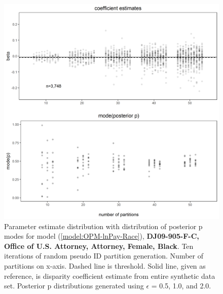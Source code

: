 \documentclass[10pt, letterpaper]{article}
\begin{document}
\begin{spacing}{1.0}
\begin{figure}[h!]
    \centering
    \includegraphics[width=5in]{images/RacePayDifferentialBetaWithPosteriorDistribution-DJ09-905-F-C.png}
    \caption{Parameter estimate distribution with distribution of posterior p modes for model (\ref{model:OPM-lnPay-Race}), \textbf{DJ09-905-F-C, Office of U.S. Attorney, Attorney, Female, Black}.  Ten iterations of random pseudo ID partition generation.  Number of partitions on x-axis.  Dashed line is threshold.  Solid line, given as reference, is disparity coefficient estimate from entire synthetic data set.  Posterior p distributions generated using $\epsilon$ = 0.5, 1.0, and 2.0.}
    \label{figure:RacePayDifferentialBetaWithPosteriorDistribution-DJ09-905-F-C}
\end{figure}

\clearpage


\end{spacing}
\end{document}
